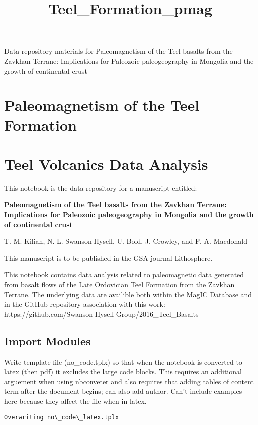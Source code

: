\documentclass[11pt]{article}
\title{Teel\_Formation\_pmag}
\begin{document}
    
    
{\Large Data repository materials for Paleomagnetism of the Teel basalts from the Zavkhan Terrane: Implications for Paleozoic paleogeography in Mongolia and the growth of continental crust}

\tableofcontents
    
    \section{Paleomagnetism of the Teel Formation}\label{paleomagnetism-of-the-teel-formation}

    \section{Teel Volcanics Data Analysis}\label{teel-volcanics-data-analysis}

    This notebook is the data repository for a manuscript entitled:

\textbf{Paleomagnetism of the Teel basalts from the Zavkhan Terrane: Implications for Paleozoic paleogeography in Mongolia and the growth of continental crust}

T. M. Kilian, N. L. Swanson-Hysell, U. Bold, J. Crowley, and F. A.
Macdonald

This manuscript is to be published in the GSA journal Lithosphere.

This notebook contains data analysis related to paleomagnetic data
generated from basalt flows of the Late Ordovician Teel Formation from
the Zavkhan Terrane. The underlying data are availible both within the
MagIC Database and in the GitHub repository association with this work:
https://github.com/Swanson-Hysell-Group/2016\_Teel\_Basalts

    \subsection{Import Modules}\label{import-modules}



    Write template file (no\_code.tplx) so that when the notebook is
converted to latex (then pdf) it excludes the large code blocks. This
requires an additional arguement when using nbconveter and also requires
that adding tables of content term after the document begins; can also
add author. Can't include examples here because they affect the file
when in latex.


    \begin{Verbatim}[commandchars=\\\{\}]
Overwriting no\_code\_latex.tplx

    \end{Verbatim}
\end{document}

